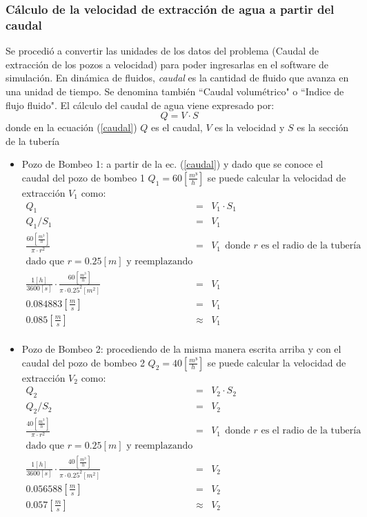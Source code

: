 \documentclass[10pt,a4paper,final]{article}
\begin{document}
\subsubsection{Cálculo de la velocidad de extracción de agua a partir del caudal}
Se procedió a convertir las unidades de los datos del problema (Caudal de extracción de los pozos a velocidad) para poder ingresarlas en el software de simulación.
En dinámica de fluidos, \emph{caudal} es la cantidad de fluido que avanza en una unidad de tiempo. Se denomina también ``Caudal volumétrico" o ``Indice de flujo fluido". El cálculo del caudal de agua viene expresado por:
\begin{equation}
Q=V \cdot S
\label{caudal}
\end{equation}
donde en la ecuación (\ref{caudal}) $Q$ es el caudal, $V$ es la velocidad y $S$ es la sección de la tubería
%
\begin{itemize}
\item Pozo de Bombeo 1: a partir de la ec. (\ref{caudal}) y dado que se conoce el caudal del pozo de bombeo 1 $Q_1=60 \left[\frac{m³}{h} \right]$ se puede calcular la velocidad de extracción $V_1$ como:\\
\begin{eqnarray*}
Q_1&=&V_1 \cdot S_1 \\
Q_1/S_1&=&V_1 \\
\frac{60 \left[\frac{m^3}{h}\right]}{\pi \cdot r^2} &=&V_1~~\textrm{donde $r$ es el radio de la tubería}\\
\mbox {dado que $r=0.25 \left[m\right]$ y reemplazando}\\
\frac{1 \left[h\right]}{3600 \left[s\right]}\cdot\frac{60 \left[\frac{m^3}{h}\right]}{\pi \cdot 0.25^2 [m^2]}&=&V_1 \\
0.084883 \left[\frac{m}{s}\right]& = & V_1\\
0.085 \left[\frac{m}{s}\right]&\approx& V_1\\
\end{eqnarray*}
\item Pozo de Bombeo 2: procediendo de la misma manera escrita arriba y con el caudal del pozo de bombeo 2 $Q_2=40 \left[\frac{m³}{h} \right]$ se puede calcular la velocidad de extracción $V_2$ como:\\
\begin{eqnarray*}
Q_2&=&V_2 \cdot S_2 \\
Q_2/S_2&=&V_2 \\
\frac{40 \left[\frac{m^3}{h}\right]}{\pi \cdot r^2} &=&V_1~~\textrm{donde $r$ es el radio de la tubería}\\
\mbox {dado que $r=0.25 \left[m\right]$ y reemplazando}\\
\frac{1 \left[h\right]}{3600 \left[s\right]}\cdot\frac{40 \left[\frac{m^3}{h}\right]}{\pi \cdot 0.25^2 [m^2]}&=&V_2 \\
0.056588 \left[\frac{m}{s}\right]& = & V_2\\
0.057 \left[\frac{m}{s}\right]&\approx& V_2\\
\end{eqnarray*}
\end{itemize}
\end{document}
